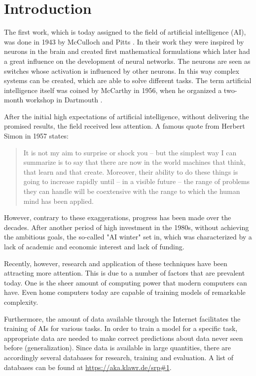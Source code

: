 \section{Introduction}

The first work, which is today assigned to the field of artificial intelligence (AI), was done in 1943 by McCulloch and Pitts \cite{McCulloch1943}.
In their work they were inspired by neurons in the brain and created first mathematical formulations which later had a great influence on the development of neural networks.
The neurons are seen as switches whose activation is influenced by other neurons.
In this way complex systems can be created, which are able to solve different tasks.
The term artificial intelligence itself was coined by McCarthy in 1956, when he organized a two-month workshop in Dartmouth \cite{McCarthy1955}.

After the initial high expectations of artificial intelligence, without delivering the promised results, the field received less attention.
A famous quote from Herbert Simon in 1957 states: 
\begin{quotation}
    It is not my aim to surprise or shock you – but the simplest way I can summarize is to say that there are now in the world machines that think, that learn and that create. Moreover, their ability to do these things is going to increase rapidly until – in a visible future – the range of problems they can handle will be coextensive with the range to which the human mind has been applied.
\end{quotation}

However, contrary to these exaggerations, progress has been made over the decades.
After another period of high investment in the 1980s, without achieving the ambitious goals, the so-called "AI winter" set in, which was characterized by a lack of academic and economic interest and lack of funding.

Recently, however, research and application of these techniques have been attracting more attention.
This is due to a number of factors that are prevalent today.
One is the sheer amount of computing power that modern computers can have.
Even home computers today are capable of training models of remarkable complexity.

Furthermore, the amount of data available through the Internet facilitates the training of AIs for various tasks.
In order to train a model for a specific task, appropriate data are needed to make correct predictions about data never seen before (generalization).
Since data is available in large quantities, there are accordingly several databases for research, training and evaluation.
A list of databases can be found at \url{https://aka.klawr.de/srp\#1}.

